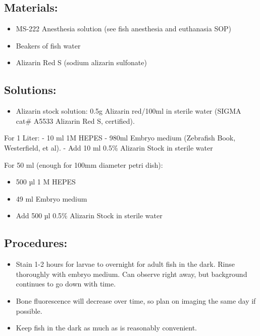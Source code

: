 \documentclass[
]{book}
\providecommand{\tightlist}{%
  \setlength{\itemsep}{0pt}\setlength{\parskip}{0pt}}
\begin{document}
\hypertarget{materials-6}{%
\subsection{Materials:}\label{materials-6}}

\begin{itemize}
\tightlist
\item
  MS-222 Anesthesia solution (see fish anesthesia and euthanasia SOP)
\item
  Beakers of fish water
\item
  Alizarin Red S (sodium alizarin sulfonate)
\end{itemize}

\hypertarget{solutions-3}{%
\subsection{Solutions:}\label{solutions-3}}

\begin{itemize}
\tightlist
\item
  Alizarin stock solution: 0.5g Alizarin red/100ml in sterile water (SIGMA cat\# A5533 Alizarin Red S, certified).
\end{itemize}

For 1 Liter:
- 10 ml 1M HEPES
- 980ml Embryo medium (Zebrafish Book, Westerfield, et al).
- Add 10 ml 0.5\% Alizarin Stock in sterile water

For 50 ml (enough for 100mm diameter petri dish):

\begin{itemize}
\tightlist
\item
  500 µl 1 M HEPES
\item
  49 ml Embryo medium
\item
  Add 500 µl 0.5\% Alizarin Stock in sterile water
\end{itemize}

\hypertarget{procedures}{%
\subsection{Procedures:}\label{procedures}}

\begin{itemize}
\tightlist
\item
  Stain 1-2 hours for larvae to overnight for adult fish in the dark. Rinse thoroughly with embryo medium. Can observe right away, but background continues to go down with time.
\item
  Bone fluorescence will decrease over time, so plan on imaging the same day if possible.
\item
  Keep fish in the dark as much as is reasonably convenient.
\end{itemize}
\end{document}
